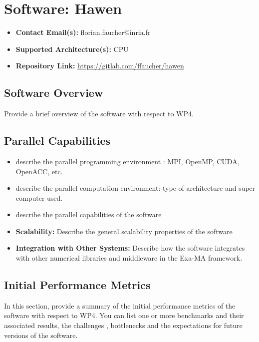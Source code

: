 \section{Software: Hawen}
\label{sec:WP4:Hawen:software}

\begin{itemize}
    \item \textbf{Contact Email(s):} florian.faucher@inria.fr
    \item \textbf{Supported Architecture(s):} CPU
    \item \textbf{Repository Link:} \href{https://gitlab.com/ffaucher/hawen}{https://gitlab.com/ffaucher/hawen}
\end{itemize}

\subsection{Software Overview}
\label{sec:WP4:Hawen:summary}

Provide a brief overview of the software with respect to WP4.

\subsection{Parallel Capabilities}
\label{sec:WP4:Hawen:performances}


\begin{itemize}
    \item describe the parallel programming  environment : MPI, OpenMP, CUDA, OpenACC, etc.
    \item describe the parallel computation environment: type of architecture and super computer used.
    \item describe the parallel capabilities of the software
    \item \textbf{Scalability:} Describe the general scalability properties of the software
    \item \textbf{Integration with Other Systems:} Describe how the software integrates with other numerical libraries and middleware in the Exa-MA framework.
\end{itemize}

\subsection{Initial Performance Metrics}
\label{sec:WP4:Hawen:metrics}

In this section, provide a summary of the initial performance metrics of the software with respect to WP4.
You can list one or more benchmarks and their associated results, the challenges , bottlenecks and the expectations for future versions of the software.



